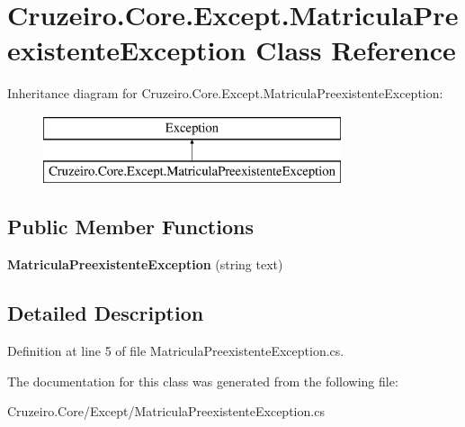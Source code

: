 \hypertarget{class_cruzeiro_1_1_core_1_1_except_1_1_matricula_preexistente_exception}{}\section{Cruzeiro.\+Core.\+Except.\+Matricula\+Preexistente\+Exception Class Reference}
\label{class_cruzeiro_1_1_core_1_1_except_1_1_matricula_preexistente_exception}
Inheritance diagram for Cruzeiro.\+Core.\+Except.\+Matricula\+Preexistente\+Exception\+:\begin{figure}[H]
\begin{center}
\leavevmode
\includegraphics[height=2.000000cm]{class_cruzeiro_1_1_core_1_1_except_1_1_matricula_preexistente_exception}
\end{center}
\end{figure}
\subsection*{Public Member Functions}
\begin{DoxyCompactItemize}
\item 
{\bfseries Matricula\+Preexistente\+Exception} (string text)\hypertarget{class_cruzeiro_1_1_core_1_1_except_1_1_matricula_preexistente_exception_a7a1ea5cf3bb009bd41642fa2ac137d15}{}\label{class_cruzeiro_1_1_core_1_1_except_1_1_matricula_preexistente_exception_a7a1ea5cf3bb009bd41642fa2ac137d15}

\end{DoxyCompactItemize}


\subsection{Detailed Description}


Definition at line 5 of file Matricula\+Preexistente\+Exception.\+cs.



The documentation for this class was generated from the following file\+:\begin{DoxyCompactItemize}
\item 
Cruzeiro.\+Core/\+Except/Matricula\+Preexistente\+Exception.\+cs\end{DoxyCompactItemize}
